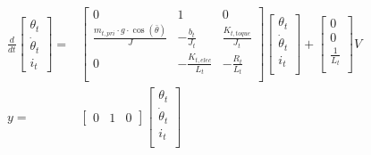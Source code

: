 \documentclass[../../main]{subfiles}
\begin{document}
\begin{equation}
      \label{eq:ss_topframe}
      \begin{split}
      \frac{d}{dt}
    \begin{bmatrix}
        \theta_t \\
        \dot \theta_t \\
        i_t
    \end{bmatrix}
    =&
    \begin{bmatrix}
        0 & 1               & 0             \\
        \frac{m_{t,pri} \cdot g \cdot \cos(\bar \theta)}{J} & -\frac{b_t}{J_t}    & \frac{K_{t,toque}}{J_t} \\
        0 & -\frac{K_{t,elec}}{L_t}  & -\frac{R_t}{L_t}  \\
    \end{bmatrix}
    \begin{bmatrix}
        \theta_t \\
        \dot \theta_t \\
        i_t \\
    \end{bmatrix}
    +
    \begin{bmatrix}
        0 \\
        0 \\
        \frac{1}{L_t} \\
    \end{bmatrix}
    V
\\
      y =&
    \begin{bmatrix}
        0 & 1 & 0
    \end{bmatrix}
    \begin{bmatrix}
        \theta_t \\
        \dot \theta_t\\
        i_t\\
    \end{bmatrix}
    \end{split}
\end{equation}
\end{document}
